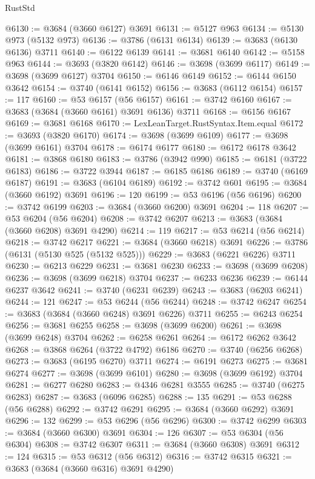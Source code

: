 \begin{lexlean}{RustStd}
\begin{coremodule}
{\begin{coremodule}
{{{{{{{{{{{{{{{{{{{{{{{{{{{{{{{{{{{{{{{{{{{{{{{@6130 := @3684 (@3660 @6127) @3691
@6131 := @5127 @963
@6134 := @5130 @973 (@5132 @973)
@6136 := @3786 (@6131 @6134)
@6139 := @3683 (@6130 @6136) @3711
@6140 := @6122 @6139
@6141 := @3681 @6140
@6142 := @5158 @963
@6144 := @3693 (@3820 @6142)
@6146 := @3698 (@3699 @6117)
@6149 := @3698 (@3699 @6127) @3704
@6150 := @6146 @6149
@6152 := @6144 @6150 @3642
@6154 := @3740 (@6141 @6152)
@6156 := @3683 (@6112 @6154)
@6157 := 117
@6160 := @53 @6157 (@56 @6157)
@6161 := @3742 @6160
@6167 := @3683 (@3684 (@3660 @6161) @3691 @6136) @3711
@6168 := @6156 @6167
@6169 := @3681 @6168
@6170 := LexLeanTarget.RustSyntax.Item.equal
@6172 := @3693 (@3820 @6170)
@6174 := @3698 (@3699 @6109)
@6177 := @3698 (@3699 @6161) @3704
@6178 := @6174 @6177
@6180 := @6172 @6178 @3642
@6181 := @3868 @6180
@6183 := @3786 (@3942 @990)
@6185 := @6181 (@3722 @6183)
@6186 := @3722 @3944
@6187 := @6185 @6186
@6189 := @3740 (@6169 @6187)
@6191 := @3683 (@6104 @6189)
@6192 := @3742 @601
@6195 := @3684 (@3660 @6192) @3691
@6196 := 120
@6199 := @53 @6196 (@56 @6196)
@6200 := @3742 @6199
@6203 := @3684 (@3660 @6200) @3691
@6204 := 118
@6207 := @53 @6204 (@56 @6204)
@6208 := @3742 @6207
@6213 := @3683 (@3684 (@3660 @6208) @3691 @4290)
@6214 := 119
@6217 := @53 @6214 (@56 @6214)
@6218 := @3742 @6217
@6221 := @3684 (@3660 @6218) @3691
@6226 := @3786 (@6131 (@5130 @525 (@5132 @525)))
@6229 := @3683 (@6221 @6226) @3711
@6230 := @6213 @6229
@6231 := @3681 @6230
@6233 := @3698 (@3699 @6208)
@6236 := @3698 (@3699 @6218) @3704
@6237 := @6233 @6236
@6239 := @6144 @6237 @3642
@6241 := @3740 (@6231 @6239)
@6243 := @3683 (@6203 @6241)
@6244 := 121
@6247 := @53 @6244 (@56 @6244)
@6248 := @3742 @6247
@6254 := @3683 (@3684 (@3660 @6248) @3691 @6226) @3711
@6255 := @6243 @6254
@6256 := @3681 @6255
@6258 := @3698 (@3699 @6200)
@6261 := @3698 (@3699 @6248) @3704
@6262 := @6258 @6261
@6264 := @6172 @6262 @3642
@6268 := @3868 @6264 (@3722 @4792) @6186
@6270 := @3740 (@6256 @6268)
@6273 := @3683 (@6195 @6270) @3711
@6274 := @6191 @6273
@6275 := @3681 @6274
@6277 := @3698 (@3699 @6101)
@6280 := @3698 (@3699 @6192) @3704
@6281 := @6277 @6280
@6283 := @4346 @6281 @3555
@6285 := @3740 (@6275 @6283)
@6287 := @3683 (@6096 @6285)
@6288 := 135
@6291 := @53 @6288 (@56 @6288)
@6292 := @3742 @6291
@6295 := @3684 (@3660 @6292) @3691
@6296 := 132
@6299 := @53 @6296 (@56 @6296)
@6300 := @3742 @6299
@6303 := @3684 (@3660 @6300) @3691
@6304 := 126
@6307 := @53 @6304 (@56 @6304)
@6308 := @3742 @6307
@6311 := @3684 (@3660 @6308) @3691
@6312 := 124
@6315 := @53 @6312 (@56 @6312)
@6316 := @3742 @6315
@6321 := @3683 (@3684 (@3660 @6316) @3691 @4290)
}}}}}}}}}}}}}}}}}}}}}}}}}}}}}}}}}}}}}}}}}}}}}}}
\end{coremodule}}
\end{coremodule}
\end{lexlean}
